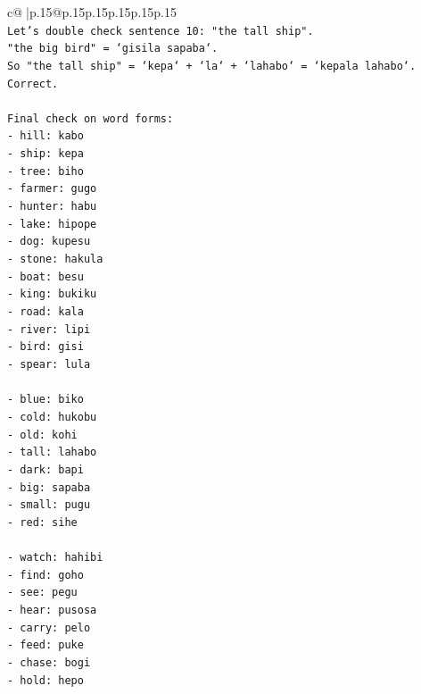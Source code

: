 \documentclass{article}
\begin{document}
{\begin{supertabular}{c@{$\;$}|p{.15\linewidth}@{}p{.15\linewidth}p{.15\linewidth}p{.15\linewidth}p{.15\linewidth}p{.15\linewidth}}
{{{\\ 
\texttt{Let's double check sentence 10: "the tall ship".} \\
\texttt{"the big bird" = `gisila sapaba`.} \\
\texttt{So "the tall ship" = `kepa` + `la` + `lahabo` = `kepala lahabo`.} \\
\texttt{Correct.} \\
\\ 
\texttt{Final check on word forms:} \\
\texttt{{-} hill: kabo} \\
\texttt{{-} ship: kepa} \\
\texttt{{-} tree: biho} \\
\texttt{{-} farmer: gugo} \\
\texttt{{-} hunter: habu} \\
\texttt{{-} lake: hipope} \\
\texttt{{-} dog: kupesu} \\
\texttt{{-} stone: hakula} \\
\texttt{{-} boat: besu} \\
\texttt{{-} king: bukiku} \\
\texttt{{-} road: kala} \\
\texttt{{-} river: lipi} \\
\texttt{{-} bird: gisi} \\
\texttt{{-} spear: lula} \\
\\ 
\texttt{{-} blue: biko} \\
\texttt{{-} cold: hukobu} \\
\texttt{{-} old: kohi} \\
\texttt{{-} tall: lahabo} \\
\texttt{{-} dark: bapi} \\
\texttt{{-} big: sapaba} \\
\texttt{{-} small: pugu} \\
\texttt{{-} red: sihe} \\
\\ 
\texttt{{-} watch: hahibi} \\
\texttt{{-} find: goho} \\
\texttt{{-} see: pegu} \\
\texttt{{-} hear: pusosa} \\
\texttt{{-} carry: pelo} \\
\texttt{{-} feed: puke} \\
\texttt{{-} chase: bogi} \\
\texttt{{-} hold: hepo} \\
}}}
\end{supertabular}}
\end{document}
